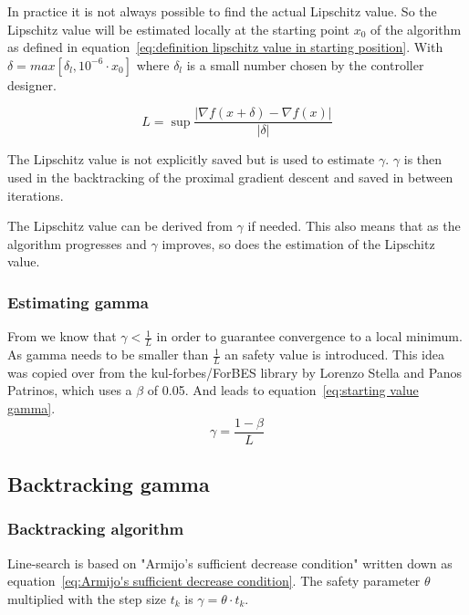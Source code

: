			In practice it is not always possible to find the actual Lipschitz value. So the Lipschitz value will be estimated locally at the starting point $x_0$ of the algorithm as defined in equation~\ref{eq:definition lipschitz value in starting position}. With $\delta=max[\delta_l,10^{-6} \cdot x_0]$ where $\delta_l$ is a small number chosen by the controller designer.
			
			\begin{equation}
			L = \underset{}{\sup} \frac{|\nabla f(x+\delta)-\nabla f(x)|}{|\delta|}
			\label{eq:definition lipschitz value in starting position}
			\end{equation}
			
			The Lipschitz value is not explicitly saved but is used to estimate $\gamma$. $\gamma$ is then used in the backtracking of the proximal gradient descent and saved in between iterations. 
			
			The Lipschitz value can be derived from $\gamma$ if needed. This also means that as the algorithm progresses and $\gamma$ improves, so does the estimation of the Lipschitz value. 
		
		\subsubsection{Estimating gamma}	
			From \cite{LorenzoStella2017} we know that $\gamma<\frac{1}{L}$ in order to guarantee convergence to a local minimum. As gamma needs to be smaller than $\frac{1}{L}$ an safety value is introduced. This idea was copied over from the kul-forbes/ForBES library by Lorenzo Stella and Panos Patrinos, which uses a $\beta$ of 0.05. And leads to equation~\ref{eq:starting value gamma}.
			\begin{equation}
			\gamma = \frac{1-\beta}{L}
			\label{eq:starting value gamma}
			\end{equation}		
	
	\subsection{Backtracking gamma}
		\subsubsection{Backtracking algorithm}
			Line-search is based on "Armijo's sufficient decrease condition" written down as equation~\ref{eq:Armijo's sufficient decrease condition}. The safety parameter $\theta$ multiplied with the step size $t_k$ is $\gamma=\theta \cdot t_k$. 
			
